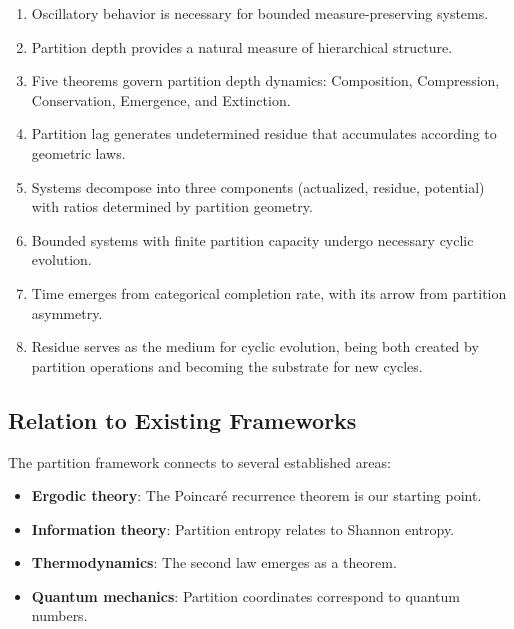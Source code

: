 \documentclass[twocolumn,10pt,a4paper]{article}
\theoremstyle{definition}
\theoremstyle{remark}
\begin{document}
\begin{enumerate}
    \item Oscillatory behavior is necessary for bounded measure-preserving systems.

    \item Partition depth provides a natural measure of hierarchical structure.

    \item Five theorems govern partition depth dynamics: Composition, Compression, Conservation, Emergence, and Extinction.

    \item Partition lag generates undetermined residue that accumulates according to geometric laws.

    \item Systems decompose into three components (actualized, residue, potential) with ratios determined by partition geometry.

    \item Bounded systems with finite partition capacity undergo necessary cyclic evolution.

    \item Time emerges from categorical completion rate, with its arrow from partition asymmetry.

    \item Residue serves as the medium for cyclic evolution, being both created by partition operations and becoming the substrate for new cycles.
\end{enumerate}

\subsection{Relation to Existing Frameworks}

The partition framework connects to several established areas:

\begin{itemize}
    \item \textbf{Ergodic theory}: The Poincar\'{e} recurrence theorem is our starting point.

    \item \textbf{Information theory}: Partition entropy relates to Shannon entropy.

    \item \textbf{Thermodynamics}: The second law emerges as a theorem.

    \item \textbf{Quantum mechanics}: Partition coordinates correspond to quantum numbers.
\end{itemize}
\end{document}
